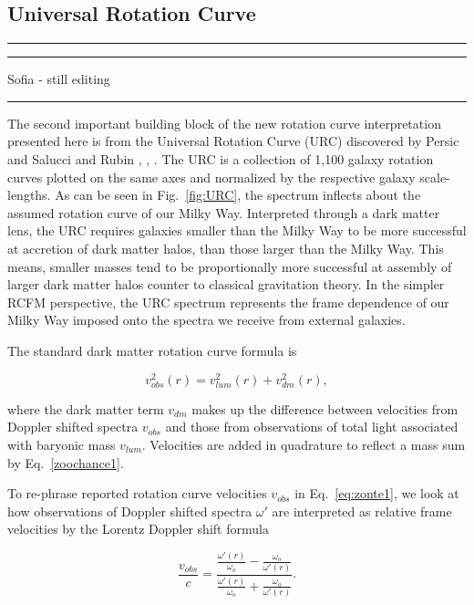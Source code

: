 \documentclass[reprint,%
 amsmath,amssymb,
 aps,
]{revtex4-1}
\begin{document}
 \subsection{Universal Rotation Curve }

 {\color{teal} \rule{\linewidth}{0.5mm}}
 
{\color{teal} \rule{\linewidth}{0.5mm}}
 
 {\color{teal}Sofia - still editing}
 {\color{teal} \rule{\linewidth}{0.5mm}}
 
 The second important building block of the new rotation curve interpretation  presented here   is from      the Universal Rotation Curve (URC) discovered by   Persic and Salucci and Rubin \cite{salucci}, \cite{Persic},  \cite{1978Rubin}.  The URC is  a collection of  1,100 galaxy rotation curves   plotted on the same   axes  and normalized by the  respective galaxy scale-lengths.  As can be seen   in Fig.~\ref{fig:URC},    
 the spectrum   inflects about   the assumed rotation curve of our   Milky Way.  Interpreted through a dark matter lens, the URC requires  
   galaxies smaller than the Milky Way to be more successful at accretion of    dark matter halos, than those    larger than the Milky Way.
   This means,  smaller masses tend to be   proportionally more successful at assembly of  larger dark matter halos counter to    classical gravitation theory.    In the simpler RCFM perspective,  the URC spectrum    represents the frame dependence of our Milky Way imposed onto the spectra  we receive  from external galaxies.  
 
  
 The standard dark matter rotation curve formula is

 \begin{equation}
v_{obs}^2 (r)=  v^2_{lum}(r) +  v^2_{dm}(r),  
\label{eq:zonte1}
\end{equation} 

where  the dark matter term $v_{dm}$ makes up the difference between velocities from Doppler shifted spectra  $v_{obs}$ and those from observations of total light associated with baryonic mass $v_{lum}$. Velocities are added in quadrature to reflect a mass sum   by Eq.~\ref{zoochance1}.


 
To re-phrase reported rotation curve velocities $v_{obs}$ in Eq.~\ref{eq:zonte1}, we look at how 
observations of Doppler shifted spectra $\omega'$ are    interpreted   as  relative    frame velocities  by the  Lorentz   Doppler shift formula 
 
 \begin{equation}
 \frac{v_{obs}}{c}=
\frac{  \frac{\omega'(r)}{\omega_o} -  \frac{\omega_o}{\omega'(r)}  }{  \frac{\omega'(r)}{\omega_o}  +  \frac{\omega_o}{\omega'(r)} } . 
\label{eq:modelLumA}
\end{equation} 
 
\end{document}
